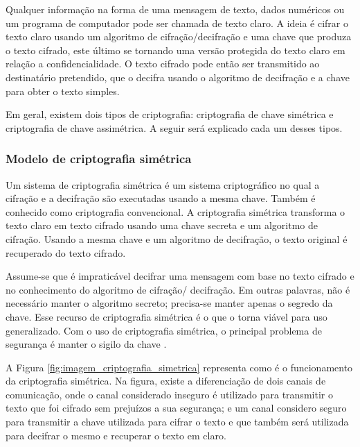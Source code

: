    Qualquer informação na forma de uma mensagem de texto, dados numéricos ou um programa de computador pode ser chamada de texto claro. A ideia é cifrar o texto claro usando um algoritmo de cifração/decifração e uma chave que produza o texto cifrado, este último se tornando uma versão protegida do texto claro em relação a confidencialidade. O texto cifrado pode então ser transmitido ao destinatário pretendido, que o decifra usando o algoritmo de decifração e a chave para obter o texto simples.\cite{beginnig_blockchain_bikramaditya}
    
    Em geral, existem dois tipos de criptografia: criptografia de chave simétrica e criptografia de chave assimétrica. A seguir será explicado cada um desses tipos.

        \subsubsection{Modelo de criptografia simétrica}
        
            Um sistema de criptografia simétrica é um sistema criptográfico no qual a cifração e a decifração são executadas usando a mesma chave. Também é conhecido como criptografia convencional. A criptografia simétrica transforma o texto claro em texto cifrado usando uma chave secreta e um algoritmo de cifração. Usando a mesma chave e um algoritmo de decifração, o texto original é recuperado do texto cifrado.\cite{cryptograpy_and_network_stallings}
            
            Assume-se que é impraticável decifrar uma mensagem com base no texto cifrado e no conhecimento do algoritmo de cifração/ decifração. Em outras palavras, não é necessário manter o algoritmo secreto; precisa-se manter apenas o segredo da chave. Esse recurso de criptografia simétrica é o que o torna viável para uso generalizado. Com o uso de criptografia simétrica, o principal problema de segurança é manter o sigilo da chave \cite{cryptograpy_and_network_stallings}.
            
            A Figura \ref{fig:imagem_criptografia_simetrica} representa como é o funcionamento da criptografia simétrica. Na figura, existe a diferenciação de dois canais de comunicação, onde o canal considerado inseguro é utilizado para transmitir o texto que foi cifrado sem prejuízos a sua segurança; e um canal considero seguro para transmitir a chave utilizada para cifrar o texto e que também será utilizada para decifrar o mesmo e recuperar o texto em claro.
            
